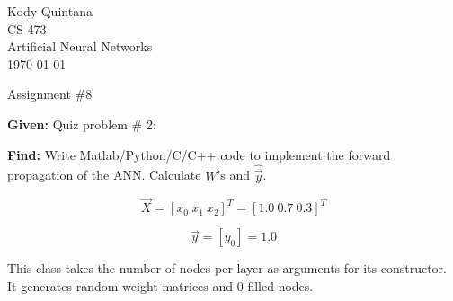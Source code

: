 \documentclass[14pt]{article}
\begin{document}
\begin{flushleft}
 
\large
Kody Quintana\\
CS 473\\
Artificial Neural Networks\\
\today\\
\boldmath

\begin{center}
Assignment \#8
\end{center}

\question
\textbf{Given:}
	Quiz problem \# 2:

\textbf{Find:}
	Write Matlab/Python/C/C++ code to implement the forward propagation of the ANN. Calculate $W$'s and $\hat{\vec{y}}$.

\[\vec{X} = [x_0 \ x_1  \ x_2]^T = [1.0 \ 0.7 \ 0.3]^T\]

\[\vec{y} = [y_0] = 1.0\]

\closequestion

This class takes the number of nodes per layer as arguments for its constructor.
It generates random weight matrices and 0 filled nodes.
\end{flushleft}
\end{document}
